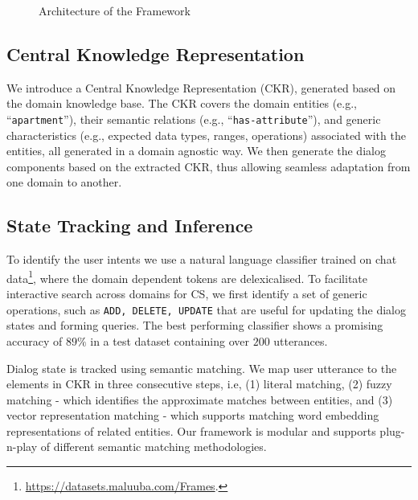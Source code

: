 \documentclass[letterpaper]{article}
\begin{document}
\begin{figure}[!ht]
\centering
{}
\caption{Architecture of the Framework}
\label{fig:system}
\end{figure}


\subsection{Central Knowledge Representation}
We introduce a Central Knowledge Representation (CKR), generated based on the domain knowledge base.
\vspace{-0.84mm}
\vspace{-2.75mm}
The CKR covers the domain entities (e.g., ``\texttt{apartment}''), their semantic relations (e.g., ``\texttt{has-attribute}''),
and generic characteristics (e.g., expected data types, ranges, operations) associated with the entities, all generated in a domain agnostic way. We then generate the dialog components based on the extracted CKR, thus allowing seamless adaptation from one domain to another.

\vspace{-2.43mm}
\subsection{State Tracking and Inference}
To identify the user intents we use a natural language classifier \cite{yang2016hierarchical} trained on chat data\footnote{ \url{https://datasets.maluuba.com/Frames}.}, where the domain dependent tokens are delexicalised. To facilitate interactive search across domains for CS, we first identify a set of generic operations, such as {\texttt{ADD, DELETE, UPDATE}} that are useful for updating the dialog states and forming queries.
The best performing classifier shows a promising accuracy of $89\%$ in a test dataset containing over $200$ utterances. %

Dialog state is tracked using semantic matching. We map user utterance to the elements in CKR in three consecutive steps, i.e, (1) literal matching, (2) fuzzy matching - which identifies the approximate matches between entities, and (3) vector representation matching - which supports matching word embedding representations of related entities.
Our framework is modular and supports plug-n-play of different semantic matching methodologies.
\end{document}
